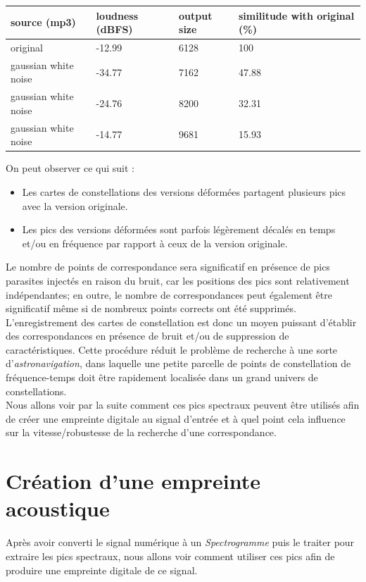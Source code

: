 \documentclass[11pt, report, french]{scrreprt}
\begin{document}
\begin{center}
	\begin{tabular}{ | m{4cm} || m{3cm}| m{3cm} | m{5cm} | } 
		\hline
		source (mp3) & loudness (dBFS) & output size & similitude with original (\%) \\ 
		\hline
		\hline
		original & -12.99 & 6128 & 100  \\ 
		\hline
		gaussian white noise & -34.77  & 7162 & 47.88  \\ 
		\hline
		gaussian white noise & -24.76 & 8200 & 32.31  \\ 
		\hline
		gaussian white noise & -14.77 & 9681 & 15.93  \\ 
		\hline
	\end{tabular}
\end{center}

\vspace{0.5cm}
On peut observer ce qui suit :\\
\begin{itemize}
	\item Les cartes de constellations des versions déformées partagent plusieurs pics avec la version originale.
	\item Les pics des versions déformées sont parfois légèrement décalés en temps et/ou en fréquence par rapport à ceux de la version originale.
\end{itemize}

\vspace{0.5cm}
Le nombre de points de correspondance sera significatif en présence de pics parasites injectés en raison du bruit, car les positions des pics sont relativement indépendantes; en outre, le nombre de correspondances peut également être significatif même si de nombreux points corrects ont été supprimés. L'enregistrement des cartes de constellation est donc un moyen puissant d'établir des correspondances en présence de bruit et/ou de suppression de caractéristiques. Cette procédure réduit le problème de recherche à une sorte d'\textit{astronavigation}, dans laquelle une petite parcelle de points de constellation de fréquence-temps doit être rapidement localisée dans un grand univers de constellations.\\

Nous allons voir par la suite comment ces pics spectraux peuvent être utilisés afin de créer une empreinte digitale au signal d'entrée et à quel point cela influence sur la vitesse/robustesse de la recherche d'une correspondance.

\chapter{Création d'une empreinte acoustique}
\label{hash}
Après avoir converti le signal numérique à un \textit{Spectrogramme} puis le traiter pour extraire les pics spectraux, nous allons voir comment utiliser ces pics afin de produire une empreinte digitale de ce signal.\\
\end{document}
